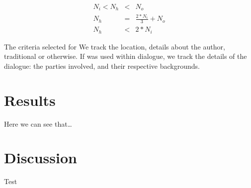 \documentclass{article}
\newcommand{\entole}{\textepsilon\textnu\texttau\textomikron\textlambda\textepsilon\xspace}
\begin{document}
\begin{eqnarray}
    N_i < N_h & < & N_o\\
    N_h & = & \frac{2 * N_i}{3} + N_o\\
    N_h & < & 2 * N_i
\end{eqnarray}

The criteria selected for We track the location, details about the author, traditional or otherwise.
If \entole was used within dialogue, we track the details of the dialogue:
the parties involved, and their respective backgrounds.

\section{Results}
Here we can see that\ldots

\section{Discussion}
Test
\end{document}

